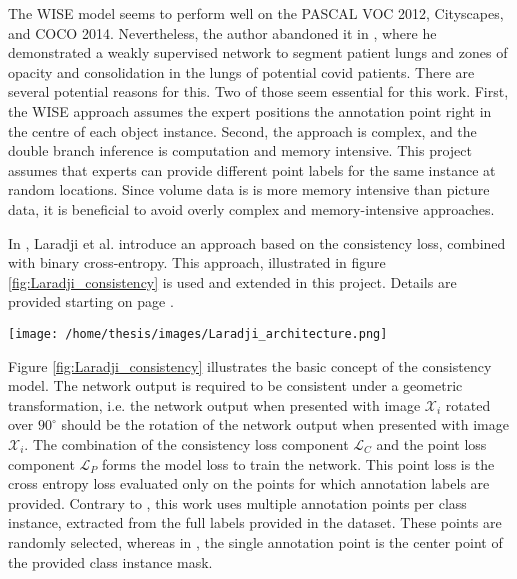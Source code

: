 \par{
    The WISE model seems to perform well on the PASCAL VOC 2012, Cityscapes, and COCO 2014. 
    Nevertheless, the author abandoned it in \cite{Laradji2021,Laradji2020b}, where he demonstrated a weakly supervised network to segment patient lungs and zones of opacity and consolidation in the lungs of potential \Gls{covid} patients.
    There are several potential reasons for this. 
    Two of those seem essential for this work. 
    First, the WISE approach assumes the expert positions the annotation point right in the centre of each object instance.
    Second, the approach is complex, and the double branch inference is computation and memory intensive. 
    This project assumes that experts can provide different point labels for the same instance at random locations.
    Since volume data is is more memory intensive than picture data, it is beneficial to avoid overly complex and memory-intensive approaches.
}
\par{
    In \cite{Laradji2021}, Laradji et al. introduce an approach based on the consistency loss, combined with binary cross-entropy.
    This approach, illustrated in figure \ref{fig:Laradji_consistency} is used and extended in this project.
    Details are provided starting on page \pageref{sec:model_concept}.
}
\begin{SCfigure}[][htb]
    \texttt{[image: /home/thesis/images/Laradji\_architecture.png]}
    \caption{Illustration from \cite{Laradji2021}. The consistency loss approach is based on the combination of two loss terms: the \Gls{unsupervisedl} consistency loss and the (weakly) \Gls{supervisedl} point (cross entropy) loss.}
    \label{fig:Laradji_consistency}
\end{SCfigure}
\par{
    Figure \ref{fig:Laradji_consistency} illustrates the basic concept of the consistency model.
    The network output is required to be consistent under a geometric transformation, i.e. the network output when presented with image $\mathcal{X}_i$ rotated over $90^\circ$ should be the rotation of the network output when presented with image $\mathcal{X}_i$.
    The combination of the consistency loss component $\mathcal{L}_C$ and the point loss component $\mathcal{L}_P$ forms the model loss to train the network.
    This point loss is the cross entropy loss evaluated only on the points for which annotation labels are provided.
    Contrary to \cite{Laradji2021}, this work uses multiple annotation points per class instance, extracted from the full labels provided in the dataset.
    These points are randomly selected, whereas in \cite{Laradji2021}, the single annotation point is the center point of the provided class instance mask.
}
